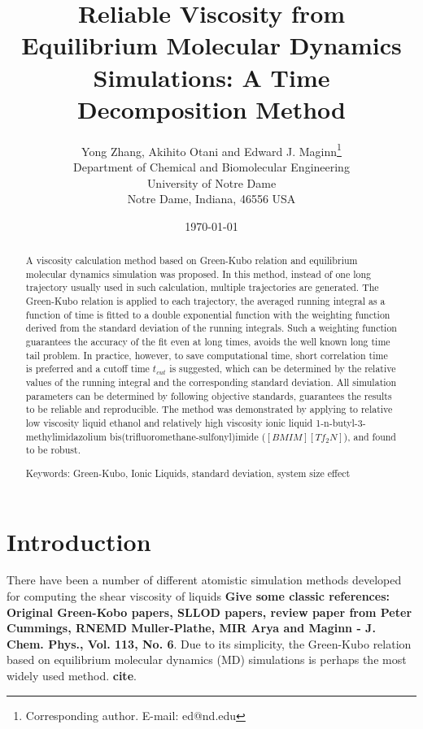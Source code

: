 \documentclass[12pt]{article}
\title{Reliable Viscosity from Equilibrium Molecular Dynamics Simulations: A Time Decomposition Method}
\author{Yong Zhang, Akihito Otani and Edward J. Maginn\thanks{Corresponding author. E-mail: ed@nd.edu} \\
                Department of Chemical and Biomolecular Engineering\\
                University of Notre Dame\\
                Notre Dame, Indiana, 46556 USA}
\date{\today}
\begin{document}

\maketitle

\newpage
\begin{abstract}

A viscosity calculation method based on Green-Kubo relation
and equilibrium molecular dynamics simulation was proposed.
In this method,
instead of one long trajectory usually used in such calculation,
multiple trajectories are generated.
The Green-Kubo relation is applied to each trajectory,
the averaged running integral as a function of time is fitted to a double exponential function
with the weighting function derived from the standard deviation of the running integrals.
Such a weighting function guarantees the accuracy of the fit even at long times,
avoids the well known long time tail problem.
In practice, however, to save computational time,
short correlation time is preferred and
a cutoff time $t_{cut}$ is suggested,
which can be determined by the relative values of the running integral and the corresponding standard deviation.
All simulation parameters can be determined by following objective standards,
guarantees the results to be reliable and reproducible.
The method was demonstrated by applying to relative low viscosity liquid ethanol and 
relatively high viscosity ionic liquid 1-n-butyl-3-methylimidazolium bis(trifluoromethane-sulfonyl)imide ($[BMIM][Tf_2N]$),
and found to be robust.
\newline

Keywords: Green-Kubo, Ionic Liquids, standard deviation, system size effect

\end{abstract}

\newpage
\section{Introduction}

There have been a number of different atomistic simulation methods developed for computing the shear viscosity of liquids {\bf Give some classic references: Original Green-Kobo papers, SLLOD papers, review paper from Peter Cummings, RNEMD Muller-Plathe, MIR Arya and Maginn - J. Chem. Phys., Vol. 113, No. 6}.
\cite{
Cummings.IECR.31.1237.1992,	%
Margulis.ACR.40.1097.2007,	%
Mu.JML.193.262.2014,		%
Hummer.JPCB.108.15873.2004,	%
Margulis.JPCB.111.4705.2007,	%
Maginn.JPCB.111.4867.2007,	%
Borodin.JPCB.113.4771.2009,	%
Mejia.JML.186.106.2013,		%
Atilhan.IECR.52.16774.2013,	%
Llovell.JPCB.117.8159.2013,	%
Lee.JPCB.118.2712.2014,		%
Yethiraj.JPCL.5.2670.2014	%
}
Due to its simplicity, 
the Green-Kubo relation based on equilibrium molecular dynamics (MD) simulations is perhaps the most widely used method. {\bf cite}. 
\end{document}
